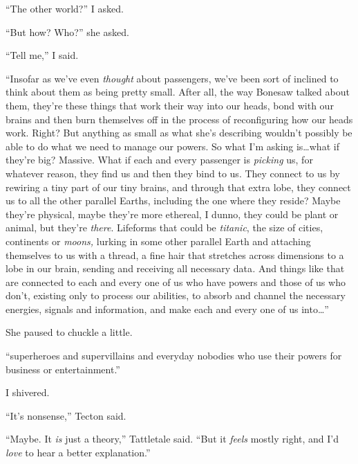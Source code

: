 ``The other world?'' I asked.



``But how?  Who?'' she asked.



``Tell me,'' I said.



``Insofar as we've even \emph{thought} about passengers, we've been sort of inclined to think about them as being pretty small.  After all, the way Bonesaw talked about them, they're these things that work their way into our heads, bond with our brains and then burn themselves off in the process of reconfiguring how our heads work.  Right?  But anything as small as what she's describing wouldn't possibly be able to do what we need to manage our powers.  So what I'm asking is\ldots what if they're big?  Massive.  What if each and every passenger is \emph{picking} us, for whatever reason, they find us and then they bind to us.  They connect to us by rewiring a tiny part of our tiny brains, and through that extra lobe, they connect us to all the other parallel Earths, including the one where they reside?  Maybe they're physical, maybe they're more ethereal, I dunno, they could be plant or animal, but they're \emph{there}.  Lifeforms that could be \emph{titanic}, the size of cities, continents or \emph{moon}\emph{s, }lurking in some other parallel Earth and attaching themselves to us with a thread, a fine hair that stretches across dimensions to a lobe in our brain, sending and receiving all necessary data\emph{.  }And things like that are\emph{ }connected to each and every one of us who have powers and those of us who don't, existing only to process our abilities, to absorb and channel the necessary energies, signals and information, and make each and every one of us into\ldots''



She paused to chuckle a little.



``\ldotsInto superheroes and supervillains and everyday nobodies who use their powers for business or entertainment.''



I shivered.



``It's nonsense,'' Tecton said.



``Maybe.  It \emph{is} just a theory,'' Tattletale said.  ``But it \emph{feels} mostly right, and I'd \emph{love} to hear a better explanation.''



